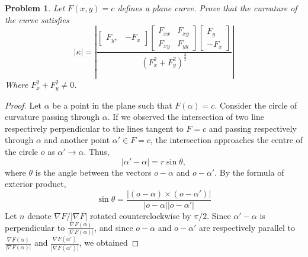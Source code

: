 \documentclass[12pt,a4paper]{article}
\newcounter{theProblemCounter}
\newtheorem{problem}[theProblemCounter]{Problem}
\begin{document}
\begin{problem}
Let $F(x, y)=c$ defines a plane curve. Prove that the curvature of the curve satisfies
\[
|\kappa| = \left|
\frac{
\left[
\begin{array}{cc} F_y, & -F_x\end{array}
\right]
\left[
\begin{array}{cc} F_{xx} & F_{xy} \\ F_{xy} & F_{yy} \end{array}
\right]
\left[
\begin{array}{c} F_y \\ -F_x\end{array}
\right]
}{(F_x^2+F_y^2)^\frac32}
\right|
\]
Where $F_x^2+F_y^2\ne 0$.
\end{problem}
\begin{proof}
Let $\alpha$ be a point in the plane such that $F(\alpha)=c$. Consider the circle of curvature passing through $\alpha$. If we observed the intersection of two line respectively perpendicular to the lines tangent to $F=c$ and passing respectively through $\alpha$ and another point $\alpha'\in F=c$, the intersection approaches the centre of the circle $o$ as $\alpha'\rightarrow \alpha$. 
Thus,
$$
	|\alpha' - \alpha| = r\sin \theta,
$$
where $\theta$ is the angle between the vectors $o-\alpha$ and $o-\alpha'$. By the formula of exterior product, 
$$
	\sin\theta = \frac{|(o - \alpha) \times (o - \alpha')|}{|o - \alpha||o - \alpha'|}
$$
Let $n$ denote $ \displaystyle \nabla F/|\nabla F| $ rotated counterclockwise by $\pi/2$.
Since $\alpha' - \alpha$ is perpendicular to $\displaystyle\frac{\nabla F(\alpha)}{|\nabla F(\alpha)|} $, and since $o - \alpha$ and $o - \alpha'$ are respectively parallel to $\displaystyle \frac{\nabla F(\alpha)}{|\nabla F(\alpha)|} $ and $ \displaystyle\frac{\nabla F(\alpha')}{|\nabla F(\alpha')|} $, we obtained


\end{proof}
\end{document}
